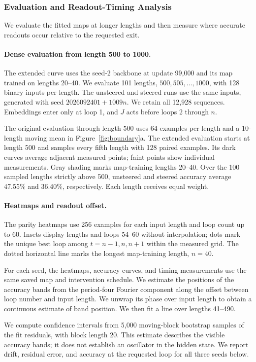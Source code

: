 \documentclass{article}
\begin{document}
\subsubsection{Evaluation and Readout-Timing Analysis}
\label{app:parity-evaluation}
We evaluate the fitted maps at longer lengths and then measure where accurate readouts occur relative to the requested exit.

\paragraph{Dense evaluation from length 500 to 1000.}
The extended curve uses the seed-2 backbone at update 99,000 and its map trained on lengths 20--40. We evaluate 101 lengths, $500,505,\ldots,1000$, with 128 binary inputs per length. The unsteered and steered runs use the same inputs, generated with seed $2026092401+1009n$. We retain all 12,928 sequences. Embeddings enter only at loop 1, and $J$ acts before loops 2 through $n$.

The original evaluation through length 500 uses 64 examples per length and a 10-length moving mean in Figure~\ref{fig:boundary}a. The extended evaluation starts at length 500 and samples every fifth length with 128 paired examples. Its dark curves average adjacent measured points; faint points show individual measurements. Gray shading marks map-training lengths 20--40. Over the 100 sampled lengths strictly above 500, unsteered and steered accuracy average 47.55\% and 36.40\%, respectively. Each length receives equal weight.

\paragraph{Heatmaps and readout offset.}
The parity heatmaps use 256 examples for each input length and loop count up to 60. Insets display lengths and loops 54--60 without interpolation; dots mark the unique best loop among $t=n-1,n,n+1$ within the measured grid. The dotted horizontal line marks the longest map-training length, $n=40$.

For each seed, the heatmaps, accuracy curves, and timing measurements use the same saved map and intervention schedule. We estimate the positions of the accuracy bands from the period-four Fourier component along the offset between loop number and input length. We unwrap its phase over input length to obtain a continuous estimate of band position. We then fit a line over lengths 41--490.

We compute confidence intervals from 5,000 moving-block bootstrap samples of the fit residuals, with block length 20. This estimate describes the visible accuracy bands; it does not establish an oscillator in the hidden state. We report drift, residual error, and accuracy at the requested loop for all three seeds below.
\end{document}
